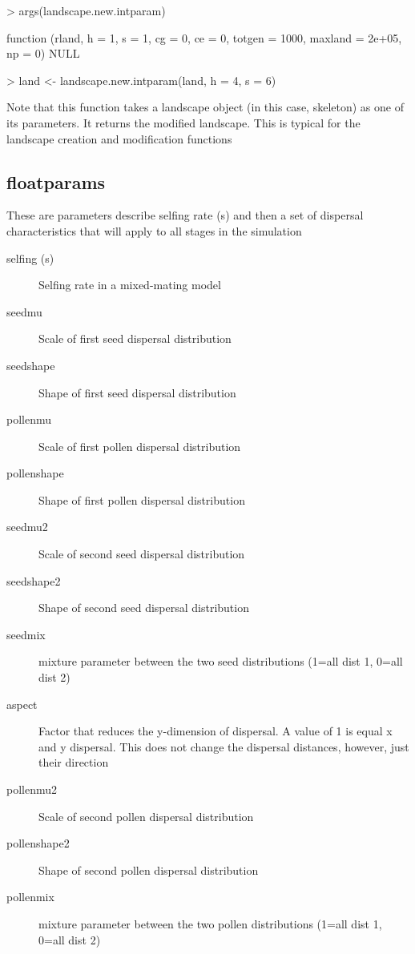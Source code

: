 \documentclass[10pt]{article}
\begin{document}
\begin{Schunk}
\begin{Sinput}
> args(landscape.new.intparam)
\end{Sinput}
\begin{Soutput}
function (rland, h = 1, s = 1, cg = 0, ce = 0, totgen = 1000, 
    maxland = 2e+05, np = 0) 
NULL
\end{Soutput}
\begin{Sinput}
> land <- landscape.new.intparam(land, h = 4, s = 6)
\end{Sinput}
\end{Schunk}

Note that this function takes a landscape object (in this case,
skeleton) as one of its parameters.  It returns the modified
landscape.  This is typical for the landscape creation and
modification functions

\subsection{floatparams}
\label{sec:floatparams}
These are parameters describe selfing rate (s) and then a set of
dispersal characteristics that will apply to all stages in the
simulation
\begin{description}
\item [selfing (s)] Selfing rate in a mixed-mating model
\item [seedmu ] Scale of first seed dispersal distribution
\item [seedshape ] Shape of first seed dispersal distribution
\item [ pollenmu] Scale of first pollen dispersal distribution
\item [pollenshape] Shape of first pollen dispersal distribution
\item [seedmu2] Scale of second seed dispersal distribution
\item [seedshape2] Shape of second seed dispersal distribution
\item [seedmix] mixture parameter between the two seed distributions (1=all dist 1, 0=all dist 2)
\item [aspect] Factor that reduces the y-dimension of dispersal. A
  value of 1 is equal x and y dispersal.  This does not change the
  dispersal distances, however, just their direction
\item [pollenmu2] Scale of second pollen dispersal distribution
\item [pollenshape2] Shape of second pollen dispersal distribution
\item [pollenmix] mixture parameter between the two pollen distributions (1=all dist 1, 0=all dist 2)
\end{description}
\end{document}
